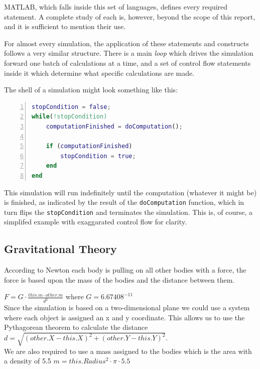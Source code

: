 \documentclass[11pt]{article}
\begin{document}
MATLAB, which falls inside this set of languages, defines every required statement. A complete study of each is, however, beyond the scope of this report, and it is sufficient to mention their use.

For almost every simulation, the application of these statements and constructs follows a very similar structure. There is a main \emph{loop} which drives the simulation forward one batch of calculations at a time, and a set of control flow statements inside it which determine what specific calculations are made.

The shell of a simulation might look something like this:
\begin{lstlisting}[language=Matlab, tabsize=4, numbers=left, frame=shadowbox]
stopCondition = false;
while(!stopCondition)
	computationFinished = doComputation();
	
	if (computationFinished)
		stopCondition = true;
	end
end
\end{lstlisting}
This simulation will run indefinitely until the computation (whatever it might be) is finished, as indicated by
the result of the \verb|doComputation| function, which in turn flips the \verb|stopCondition| and terminates the 
simulation. This is, of course, a simplifed example with exaggarated control flow for clarity.

\subsection{Gravitational Theory}

According to Newton each body is pulling on all other bodies with a force, the force is based upon the mass of the bodies and the distance between them.

$F = G \cdot \frac{this.m \cdot other.m}{d^{2}}$
where $G = 6.67408^{-11}$\\

Since the simulation is based on a two-dimensional plane we could use a system where each object is assigned an x and y coordinate. This allows us to use the Pythagorean theorem to calculate the distance 
$d = \sqrt{(other.X - this.X)^{2} + (other.Y - this.Y)^{2}}$.\\

We are also required to use a mass assigned to the bodies which is the area with a density of 5.5
$m = this.Radius^{2} \cdot \pi \cdot 5.5$\\
\end{document}

